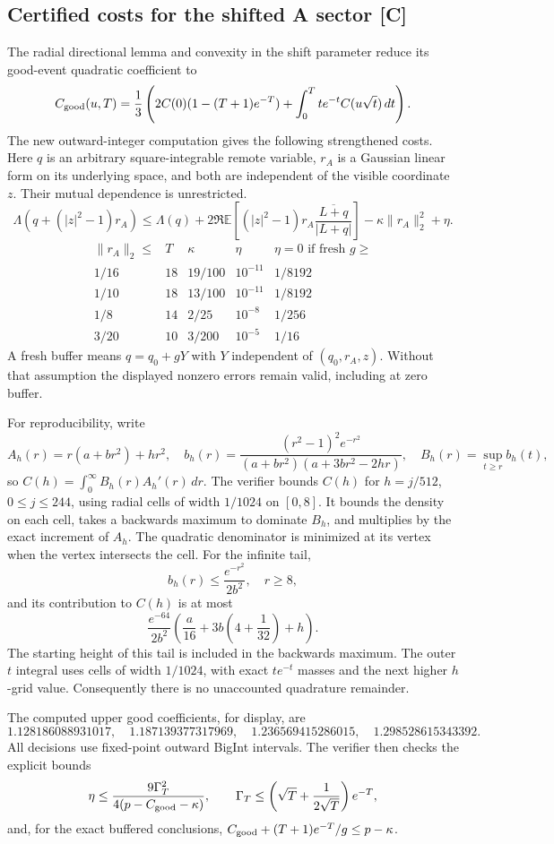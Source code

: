 \subsection{Certified costs for the shifted A sector [C]}
The radial directional lemma and convexity in the shift parameter reduce
its good-event quadratic coefficient to
\[
 C_{\rm good}(u,T)=\frac13\left(
 2C(0)(1-(T+1)e^{-T})+\int_0^T t e^{-t} C(u\sqrt t)\,dt\right).
\]
The new outward-integer computation gives the following strengthened
costs. Here $q$ is an arbitrary square-integrable remote variable, $r_A$
is a Gaussian linear form on its underlying space, and both are
independent of the visible coordinate $z$. Their mutual dependence is
unrestricted.
\[
\Lambda(q+(|z|^2-1)r_A)\le\Lambda(q)
+2\Re\mathbb E\left[(|z|^2-1)r_A
 \frac{\overline{L+q}}{|L+q|}\right]
-\kappa\|r_A\|_2^2+\eta.
\]
\[
\begin{array}{c|c|c|c|c}
\|r_A\|_2\le&T&\kappa&\eta&\eta=0\text{ if fresh }g\ge\\\hline
1/16&18&19/100&10^{-11}&1/8192\\
1/10&18&13/100&10^{-11}&1/8192\\
1/8&14&2/25&10^{-8}&1/256\\
3/20&10&3/200&10^{-5}&1/16
\end{array}
\]
A fresh buffer means $q=q_0+gY$ with $Y$ independent of
$(q_0,r_A,z)$. Without that assumption the displayed nonzero errors
remain valid, including at zero buffer.

For reproducibility, write
\[
 A_h(r)=r(a+br^2)+hr^2,\quad
 b_h(r)=\frac{(r^2-1)^2e^{-r^2}}
 {(a+br^2)(a+3br^2-2hr)},\quad
 B_h(r)=\sup_{t\ge r}b_h(t),
\]
so $C(h)=\int_0^\infty B_h(r)A_h'(r)\,dr$.
The verifier bounds $C(h)$ for $h=j/512$, $0\le j\le244$, using
radial cells of width $1/1024$ on $[0,8]$. It bounds the density on each
cell, takes a backwards maximum to dominate $B_h$, and multiplies by
the exact increment of $A_h$. The quadratic denominator is minimized at
its vertex when the vertex intersects the cell. For the infinite tail,
\[
 b_h(r)\le\frac{e^{-r^2}}{2b^2},\quad r\ge8,
\]
and its contribution to $C(h)$ is at most
\[
 \frac{e^{-64}}{2b^2}\left(\frac a{16}
       +3b\left(4+\frac1{32}\right)+h\right).
\]
The starting height of this tail is included in the backwards maximum.
The outer $t$ integral uses cells of width $1/1024$, with exact
$te^{-t}$ masses and the next higher $h$-grid value. Consequently there
is no unaccounted quadrature remainder.

The computed upper good coefficients, for display, are
\[
 1.128186088931017,\quad1.187139377317969,\quad
 1.236569415286015,\quad1.298528615343392.
\]
All decisions use fixed-point outward BigInt intervals. The verifier
then checks the explicit bounds
\[
 \eta\le\frac{9\Gamma_T^2}{4(p-C_{\rm good}-\kappa)},\qquad
 \Gamma_T\le\left(\sqrt T+\frac1{2\sqrt T}\right)e^{-T},
\]
and, for the exact buffered conclusions,
$C_{\rm good}+(T+1)e^{-T}/g\le p-\kappa$.

